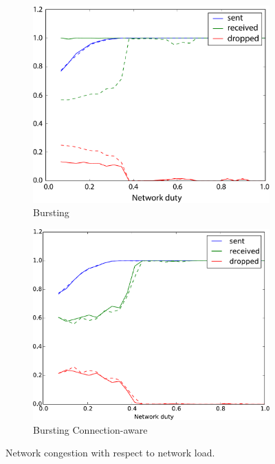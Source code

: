 \documentclass[a4paper, 11pt]{article}
\begin{document}
\begin{figure}
	\begin{subfigure}[htbp]{.5\linewidth}
		\centering
		\includegraphics[width=0.9\linewidth]{images/bursting.pdf}
		\caption{Bursting}
		\label{fig:bursting}
	\end{subfigure}
	\begin{subfigure}[htbp]{.5\linewidth}
		\centering
		\includegraphics[width=0.9\linewidth]{images/bursting_connaware2.pdf}
		\caption{Bursting Connection-aware}	
		\label{fig:bursting_aware}
	\end{subfigure}
	\caption{Network congestion with respect to network load.}
\end{figure}
\end{document}

